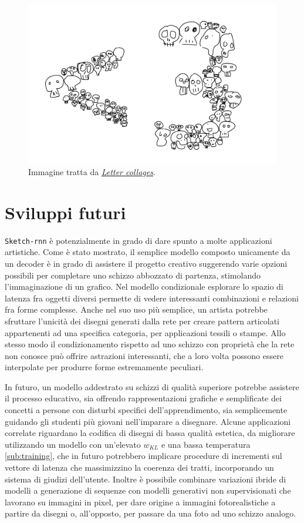\begin{figure}
	\centering
	\includegraphics[width=\linewidth]{img/heart.png}
	\caption{Immagine tratta da \href{http://frauzufall.de/en/2017/google-quick-draw/}{\textit{Letter collages}}.}
	\label{img:32}
\end{figure}

\section{Sviluppi futuri} %
\label{sec:sviluppi_futuri}
\texttt{Sketch-rnn} è potenzialmente in grado di dare spunto a molte applicazioni artistiche. Come è stato mostrato, il semplice modello composto unicamente da un decoder è in grado di assistere il progetto creativo suggerendo varie opzioni possibili per completare uno schizzo abbozzato di partenza, stimolando l'immaginazione di un grafico. Nel modello condizionale esplorare lo spazio di latenza fra oggetti diversi permette di vedere interessanti combinazioni e relazioni fra forme complesse. Anche nel suo uso più semplice, un artista potrebbe sfruttare l'unicità dei disegni generati dalla rete per creare pattern articolati appartenenti ad una specifica categoria, per applicazioni tessili o stampe. Allo stesso modo il condizionamento rispetto ad uno schizzo con proprietà che la rete non conosce può offrire astrazioni interessanti, che a loro volta possono essere interpolate per produrre forme estremamente peculiari.

In futuro, un modello addestrato su schizzi di qualità superiore potrebbe assistere il processo educativo, sia offrendo rappresentazioni grafiche e semplificate dei concetti a persone con disturbi specifici dell'apprendimento, sia semplicemente guidando gli studenti più giovani nell'imparare a disegnare. Alcune applicazioni correlate riguardano la codifica di disegni di bassa qualità estetica, da migliorare utilizzando un modello con un'elevato $w_{KL}$ e una bassa temperatura \ref{sub:training}, che in futuro potrebbero implicare procedure di incrementi sul vettore di latenza che massimizzino la coerenza dei tratti, incorporando un sistema di giudizi dell'utente. Inoltre è possibile combinare variazioni ibride di modelli a generazione di sequenze con modelli generativi non supervisionati che lavorano su immagini in pixel, per dare origine a immagini fotorealistiche a partire da disegni o, all'opposto, per passare da una foto ad uno schizzo analogo.

